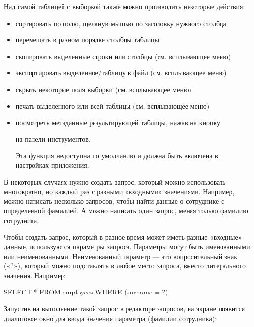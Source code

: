 Над самой таблицей с выборкой также можно производить некоторые действия:
\begin{itemize}
	\item сортировать по полю, щелкнув мышью по заголовку нужного столбца
	\item перемещать в разном порядке столбцы таблицы
	\item скопировать выделенные строки или столбцы (см. всплывающее меню)
	\item экспортировать выделенное/таблицу в файл (см. всплывающее меню)
	\item скрыть некоторые поля выборки (см. всплывающее меню)
	\item печать выделенного или всей таблицы (см. всплывающее меню)
	\item посмотреть метаданные результирующей таблицы, нажав на кнопку  на панели инструментов.
	
	\begin{redremark}
		Эта функция недоступна по умолчанию и должна быть включена в настройках приложения.
	\end{redremark}
\end{itemize}

\label{sec:param_queries}

В некоторых случаях нужно создать запрос, который можно использовать многократно, но каждый раз с разными «входными» значениями. Например, можно написать несколько запросов, чтобы найти данные о сотруднике с определенной фамилией. А можно написать один запрос, меняя только фамилию сотрудника.

Чтобы создать запрос, который в разное время может иметь разные «входные» данные, используются параметры запроса. Параметры могут быть именованными или неименованными. Неименованный параметр — это вопросительный знак («?»), который можно подставлять в любое место запроса, вместо литерального значения. Например:

\begin{redexample}\ttfamily
SELECT * FROM employees WHERE (surname = ?)  
\end{redexample}

Запустив на выполнение такой запрос в редакторе запросов, на экране появится диалоговое окно для ввода значения параметра (фамилии сотрудника):

